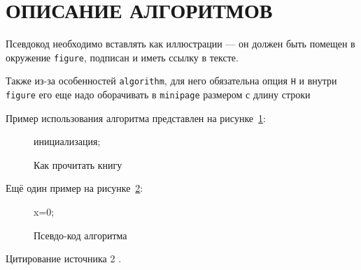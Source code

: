 \section{ОПИСАНИЕ АЛГОРИТМОВ}

Псевдокод необходимо вставлять как иллюстрации --- он должен быть помещен в окружение \texttt{figure}, подписан и иметь ссылку в тексте.

Также из-за особенностей \texttt{algorithm}, для него обязательна опция \texttt{H} и внутри \texttt{figure} его еще надо оборачивать в \texttt{minipage} размером с длину строки

Пример использования алгоритма представлен на рисунке~\ref{alg:alg1}:

\begin{figure}
\begin{minipage}{\linewidth}
\begin{algorithm}[H]  
    \SetAlgoVlined
    инициализация;
\end{algorithm}
\end{minipage}
\caption{Как прочитать книгу}
\label{alg:alg1}
\end{figure}

\pagebreak

Ещё один пример на рисунке~\ref{alg:generalGP}:

\begin{figure}
\begin{minipage}{\linewidth}
\begin{algorithm}[H]
	\SetAlgoVlined %
	
	x=0;
	\While{ $\tau_{norm} > \varepsilon_{tol}$ }{
		$s_{k-1} \leftarrow x_k - x_{k-1}$;
		\tcc*[l]{Step lenght computation:} %
		\eIf{$k$ is even}{
			$ \alpha_k^{ABB} = \frac{ s_{k-1}^T y_{k-1}}{y_{k-1}^T y_{k-1}}$
		}{ %
		$\alpha_k^{ABB} = \frac{ s_{k-1}^T s_{k-1}}{s_{k-1}^T y_{k-1}}$
	} %
	$k \leftarrow k + 1$;
	\For{ i = 1}{
		$x_{i+1} = P_\Omega(x_i - \alpha_k^{ABB}*g_k)$;
	} %
	\tcc*[l]{Compute the termination constant} %
	$\tau_{norm} = abs ( ||x_{k}||_2 - ||x_{k-1}||_2)$
} %
\end{algorithm}
\end{minipage}
\caption{Псевдо-код алгоритма}
\label{alg:generalGP}
\end{figure}

Цитирование источника 2 \cite{cite_1_10}.
